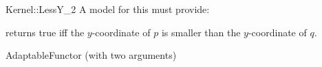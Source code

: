 \begin{ccRefFunctionObjectConcept}{Kernel::LessY_2}
A model for this must provide:


{returns true iff the $y$-coordinate of $p$ is smaller than the
$y$-coordinate of $q$.}

\ccRefines
AdaptableFunctor (with two arguments)

\ccSeeAlso
{}\\


\end{ccRefFunctionObjectConcept}
